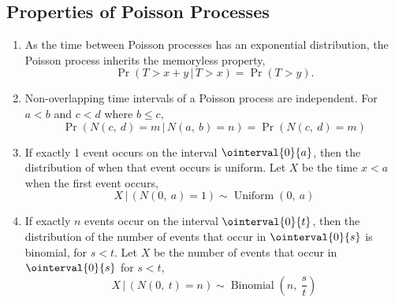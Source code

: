 \documentclass{article}
\begin{document}
\subsection{Properties of Poisson Processes}
\begin{enumerate}
    \item As the time between Poisson processes has an exponential distribution, the Poisson process inherits the
          memoryless property,
          \begin{equation*}
              \Pr{\left( T > x + y \,\vert\, T > x \right)} = \Pr{\left( T > y \right)}.
          \end{equation*}
    \item Non-overlapping time intervals of a Poisson process are independent. For \(a < b\) and \(c < d\) where \(b \leq c\),
          \begin{equation*}
              \Pr{\left( N\left( c,\: d \right) = m \,\vert\, N\left( a,\: b \right) = n \right)} = \Pr{\left( N\left( c,\: d \right) = m \right)}
          \end{equation*}
          \item\label{poisson_property_1_event} If exactly 1 event occurs on the interval \(\ointerval{0}{a}\), then the distribution of when that event occurs is
          uniform. Let \(X\) be the time \(x < a\) when the first event occurs,
          \begin{equation*}
              X \,\vert\, \left( N\left( 0,\: a \right) = 1 \right) \sim \operatorname{Uniform}{\left( 0,\: a \right)}
          \end{equation*}
          \item\label{poisson_property_n_events} If exactly \(n\) events occur on the interval \(\ointerval{0}{t}\), then the distribution of the number of events
          that occur in \(\ointerval{0}{s}\) is binomial, for \(s < t\). Let \(X\) be the number of events that occur in \(\ointerval{0}{s}\) for \(s < t\),
          \begin{equation*}
              X \,\vert\, \left( N\left( 0,\: t \right) = n \right) \sim \operatorname{Binomial}{\left( n,\: \frac{s}{t} \right)}
          \end{equation*}
\end{enumerate}
\end{document}
